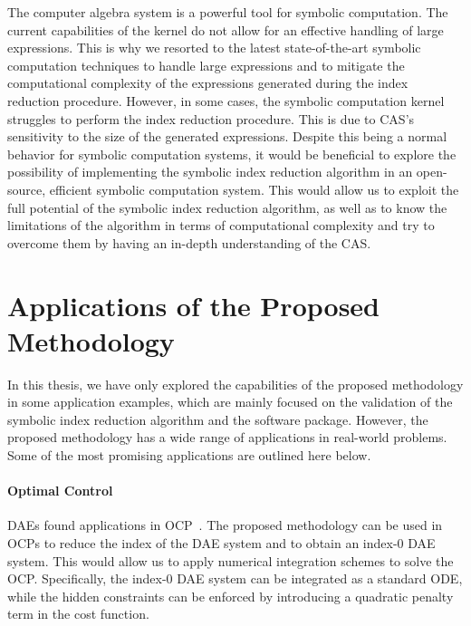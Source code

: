 The \Maple{} computer algebra system is a powerful tool for symbolic computation. The current capabilities of the \Maple{} kernel do not allow for an effective handling of large expressions. This is why we resorted to the latest state-of-the-art symbolic computation techniques to handle large expressions and to mitigate the computational complexity of the expressions generated during the index reduction procedure. However, in some cases, the \Maple{} symbolic computation kernel struggles to perform the index reduction procedure. This is due to \ac{CAS}'s sensitivity to the size of the generated expressions. Despite this being a normal behavior for symbolic computation systems, it would be beneficial to explore the possibility of implementing the symbolic index reduction algorithm in an open-source, efficient symbolic computation system. This would allow us to exploit the full potential of the symbolic index reduction algorithm, as well as to know the limitations of the algorithm in terms of computational complexity and try to overcome them by having an in-depth understanding of the \ac{CAS}.

\section{Applications of the Proposed Methodology}

In this thesis, we have only explored the capabilities of the proposed methodology in some application examples, which are mainly focused on the validation of the symbolic index reduction algorithm and the \Indigo{} software package. However, the proposed methodology has a wide range of applications in real-world problems. Some of the most promising applications are outlined here below.

\paragraph{Optimal Control}

\acp{DAE} found applications in \ac{OCP}~\cite{gerdts2012optimal, gerdts2003optimal, gerdts2005gradient}. The proposed methodology can be used in \acp{OCP} to reduce the index of the \ac{DAE} system and to obtain an index-0 \ac{DAE} system. This would allow us to apply numerical integration schemes to solve the \ac{OCP}. Specifically, the index-0 \ac{DAE} system can be integrated as a standard \ac{ODE}, while the hidden constraints can be enforced by introducing a quadratic penalty term in the cost function.

